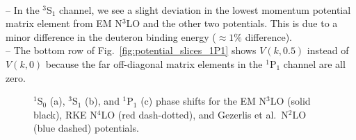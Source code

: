 \documentclass[preprintnumbers,floatfix,aps,prc,preprint,nofootinbib]{revtex4-1}
\begin{document}
\\
-- In the $^3$S$_1$ channel, we see a slight deviation in the lowest momentum potential matrix element from EM N$^3$LO and the other two potentials. This is due to a minor difference in the deuteron binding energy ($\approx 1\%$ difference).
\\
-- The bottom row of Fig.~\ref{fig:potential_slices_1P1} shows $V(k,0.5)$ instead of $V(k,0)$ because the far off-diagonal matrix elements in the $^1$P$_1$ channel are all zero.
\begin{figure}[H]
	\centering
	\quad
	\quad
	\caption{$^1$S$_0$ (a), $^3$S$_1$ (b), and $^1$P$_1$ (c) phase shifts for the EM N$^3$LO (solid black), RKE N$^4$LO (red dash-dotted), and Gezerlis et al.~N$^2$LO (blue dashed) potentials.}
	\label{fig:phase_shifts}
\end{figure}
%
\end{document}
